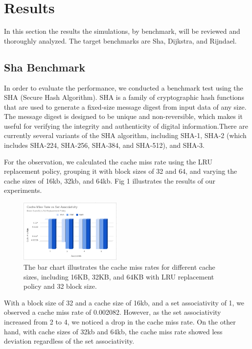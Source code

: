 \documentclass[conference]{IEEEtran}
\begin{document}
\section{Results}
In this section the results the simulations, by benchmark, will be reviewed and thoroughly analyzed. The target benchmarks are Sha, Dijkstra, and Rijndael.

\subsection{Sha Benchmark}
In order to evaluate the performance, we conducted a benchmark test using the SHA (Secure Hash Algorithm). SHA is a family of cryptographic hash functions that are used to generate a fixed-size message digest from input data of any size. The message digest is designed to be unique and non-reversible, which makes it useful for verifying the integrity and authenticity of digital information.There are currently several variants of the SHA algorithm, including SHA-1, SHA-2 (which includes SHA-224, SHA-256, SHA-384, and SHA-512), and SHA-3.

For the observation, we calculated the cache miss rate using the LRU replacement policy, grouping it with block sizes of 32 and 64, and varying the cache sizes of 16kb, 32kb, and 64kb. Fig 1 illustrates the results of our experiments.

\begin{figure}[H]
    \centering
    \includegraphics[width=0.45\textwidth]{sha/sha_cache_vs_setAssocBL32.png}
    \caption{The bar chart illustrates the cache miss rates for different cache sizes, including 16KB, 32KB, and 64KB with LRU replacement policy and 32 block size.}
\end{figure}

With a block size of 32 and a cache size of 16kb, and a set associativity of 1, we observed a cache miss rate of 0.002082. However, as the set associativity increased from 2 to 4, we noticed a drop in the cache miss rate. On the other hand, with cache sizes of 32kb and 64kb, the cache miss rate showed less deviation regardless of the set associativity.
\end{document}
